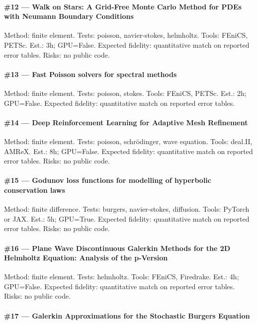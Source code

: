 \documentclass[10pt,letterpaper]{article}
\begin{document}
\paragraph{\#12 — Walk on Stars: A Grid-Free Monte Carlo Method for PDEs with Neumann Boundary Conditions}

Method: finite element. Tests: poisson, navier-stokes, helmholtz. Tools: FEniCS, PETSc. Est.: 3h; GPU=False. Expected fidelity: quantitative match on reported error tables. Risks: no public code.

\paragraph{\#13 — Fast Poisson solvers for spectral methods}

Method: finite element. Tests: poisson, stokes. Tools: FEniCS, PETSc. Est.: 2h; GPU=False. Expected fidelity: quantitative match on reported error tables. 

\paragraph{\#14 — Deep Reinforcement Learning for Adaptive Mesh Refinement}

Method: finite element. Tests: poisson, schrödinger, wave equation. Tools: deal.II, AMReX. Est.: 8h; GPU=False. Expected fidelity: quantitative match on reported error tables. Risks: no public code.

\paragraph{\#15 — Godunov loss functions for modelling of hyperbolic conservation laws}

Method: finite difference. Tests: burgers, navier-stokes, diffusion. Tools: PyTorch or JAX. Est.: 5h; GPU=True. Expected fidelity: quantitative match on reported error tables. Risks: no public code.

\paragraph{\#16 — Plane Wave Discontinuous Galerkin Methods for the 2D Helmholtz Equation: Analysis of the p-Version}

Method: finite element. Tests: helmholtz. Tools: FEniCS, Firedrake. Est.: 4h; GPU=False. Expected fidelity: quantitative match on reported error tables. Risks: no public code.

\paragraph{\#17 — Galerkin Approximations for the Stochastic Burgers Equation}
\end{document}
